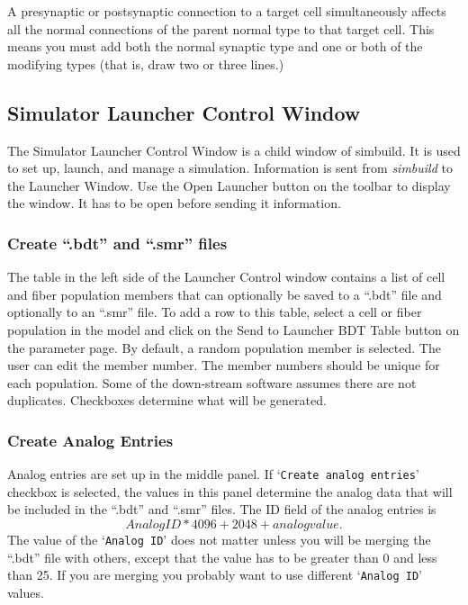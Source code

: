 \documentclass[12pt,openany,oneside]{book}
\newcommand{\tisamp}[1]{`\texttt{#1}'}
\newcommand{\prog}[1]{\textit{{#1}}}
\newcommand{\ext}[1]{{{``.#1''}}}
\begin{document}
A presynaptic or postsynaptic connection to a target cell simultaneously
affects all the normal connections of the parent normal type to that
target cell. This means you must add both the normal synaptic type and one
or both of the modifying types (that is, draw two or three lines.)


\subsection{Simulator Launcher Control Window}
\label{Simulator Launcher Control Window}
The Simulator Launcher Control Window is a child window of simbuild. It is
used to set up, launch, and manage a simulation. Information is sent from
\prog{simbuild} to the Launcher Window. Use the Open Launcher button on 
the toolbar to display the window.  It has to be open before sending
it information.

\subsubsection{Create \ext{bdt} and \ext{smr} files}
The table in the left side of the Launcher Control window contains a list
of cell and fiber population members that can optionally be saved to a
\ext{bdt} file and optionally to an \ext{smr} file. To add a row to this
table, select a cell or fiber population in the model and click on the
Send to Launcher BDT Table button on the parameter page. By default, a
random population member is selected. The user can edit the member number.
The member numbers should be unique for each population. Some of the
down-stream software assumes there are not duplicates. Checkboxes
determine what will be generated. 

\subsubsection{Create Analog Entries}

Analog entries are set up in the middle panel. If \tisamp{Create analog
entries} checkbox is selected, the values in this panel determine the
analog data that will be included in the \ext{bdt}  and \ext{smr} files.
The ID field of the analog entries is \[Analog ID * 4096 + 2048 + analog
value.\]  The value of the \tisamp{Analog ID} does not matter unless you
will be merging the \ext{bdt} file with others, except that the value has
to be greater than 0 and less than 25. If you are merging you probably
want to use different \tisamp{Analog ID} values.
\end{document}
